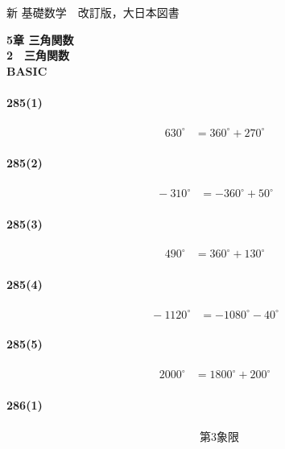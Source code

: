 \documentclass[fleqn,a4j,dvipdfmx,uplatex,twocolumn]{jsarticle}
\begin{document}
\begin{flushleft}
  新 基礎数学　改訂版，大日本図書
\end{flushleft}
\begin{center}
  \textbf{5章 三角関数}\\
  \textbf{2　三角関数}\\
  \textbf{BASIC}\\
\end{center}

\paragraph{285(1)}
\begin{align*}
  \quad 630^{\circ} &= 360^{\circ} + 270^{\circ}
\end{align*}

\paragraph{285(2)}
\begin{align*}
  \quad -310^{\circ} &= -360^{\circ} + 50^{\circ}
\end{align*}

\paragraph{285(3)}
\begin{align*}
  \quad 490^{\circ} &= 360^{\circ} + 130^{\circ}
\end{align*}

\paragraph{285(4)}
\begin{align*}
  \quad -1120^{\circ} &= -1080^{\circ} - 40^{\circ}
\end{align*}

\paragraph{285(5)}
\begin{align*}
  \quad 2000^{\circ} &= 1800^{\circ} + 200^{\circ}
\end{align*}

\paragraph{286(1)}
\begin{align*}
  \quad &\text{第3象限}
\end{align*}
\end{document}
